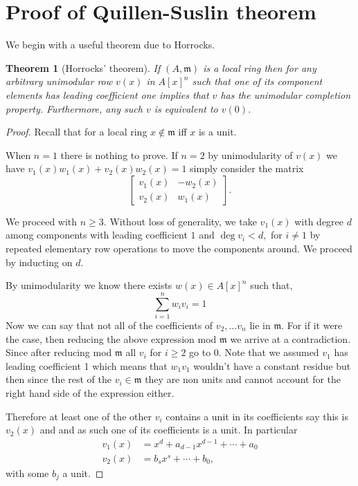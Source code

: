 \documentclass[12pt]{report}
\numberwithin{equation}{section}
\newcounter{dummy} \numberwithin{dummy}{section}
\newtheorem{theorem}[dummy]{Theorem}
\begin{document}
	\section{Proof of Quillen-Suslin theorem}
	We begin with a useful theorem due to Horrocks.
	\begin{theorem}[Horrocks' theorem]
	If $(A, \mathfrak{m})$ is a local ring then for any arbitrary unimodular row $v(x)$ in $A[x]^n$ such that one of its component elements has leading coefficient one implies that $v$ has the unimodular completion property. Furthermore, any such $v$ is equivalent to $v(0)$.
	\end{theorem}
	\begin{proof}
	Recall that for a local ring $x \not \in \mathfrak m$ iff $ x  $ is a unit.
	
	When $n=1 $ there is nothing to prove. If $n=2$ by unimodularity of $v(x)$ we have $v_1(x)w_1(x)+v_2(x)w_2(x)=1$ simply consider the matrix
	\[ \begin{bmatrix}
		v_1(x) & -w_2(x)\\
		v_2(x) & w_1(x)
	\end{bmatrix}. \]
	
	We proceed with $n \geq 3$.
	Without loss of generality, we take $v_1(x)$ with degree $d $ among components with leading coefficient $1$ and $\deg v_i < d, $ for $i \neq 1$ by repeated elementary row operations to move the components around. We proceed by inducting on $d$.
	
	By unimodularity we know there exists $w(x)\in A[x]^n$ such that,
	\[ \sum_{i=1}^n w_i v_i = 1 \]
	Now we can say that not all of the coefficients of $v_2, \dots v_n $ lie in $\mathfrak m$. For if it were the case, then reducing the above expression mod $\mathfrak m$ we arrive at a contradiction. Since after reducing mod $\mathfrak m$ all $v_i$ for $i \geq 2$ go to $0.$ Note that we assumed $v_1 $ has leading coefficient 1 which means that $w_1v_1$ wouldn't have a constant residue but then since the rest of the $v_i \in \mathfrak{m}$ they are non units and cannot account for the right hand side of the expression either.
	
	Therefore at least one of the other $v_i$ contains a unit in its coefficients say this is $v_2(x)$ and and as such one of its coefficients is a unit.
	In particular
	\begin{align*}
		v_1(x)&= x^d +a_{d-1} x^{d-1} + \cdots +a_0\\
		v_2(x)&=b_s x^s + \cdots + b_0,
	\end{align*}
	with some $b_j$ a unit.
	

\end{proof}
\end{document}
